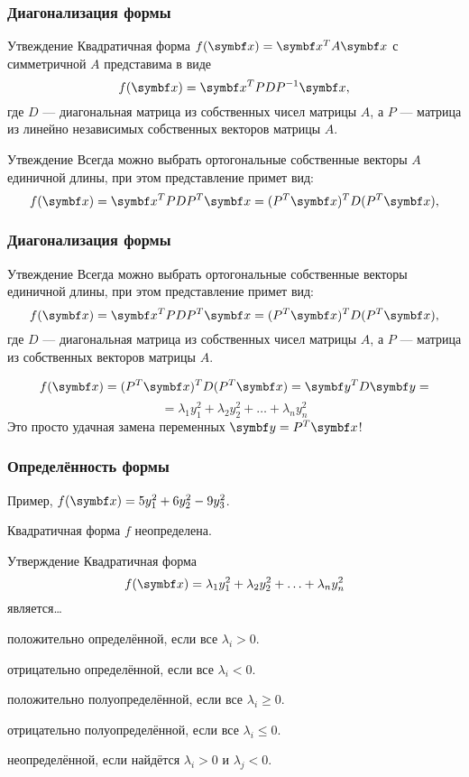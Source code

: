 \begin{frame}
    \frametitle{Диагонализация формы}

    \begin{block}{Утвеждение}
        Квадратичная форма $f(\bx) = \bx^T A \bx$ с симметричной $A$ представима в виде
        \[
        f(\bx) = \bx^T PDP^{-1} \bx,    
        \] 
        где $D$ — диагональная матрица из собственных чисел матрицы $A$, 
        а $P$ — матрица из линейно независимых собственных векторов матрицы $A$.
    \end{block}
    \pause
\begin{block}{Утвеждение}
    Всегда можно выбрать ортогональные собственные векторы $A$ единичной длины, 
    при этом представление примет вид:
    \[
    f(\bx) = \bx^T PDP^T \bx = (P^T \bx)^T D (P^T \bx),    
    \] 
\end{block}
    
\end{frame}


\begin{frame}
    \frametitle{Диагонализация формы}
\begin{block}{Утвеждение}
    Всегда можно выбрать ортогональные собственные векторы единичной длины, 
    при этом представление примет вид:
    \[
    f(\bx) = \bx^T PDP^T \bx = (P^T \bx)^T D (P^T \bx),    
    \] 
    где $D$ — диагональная матрица из собственных чисел матрицы $A$, 
    а $P$ — матрица из собственных векторов матрицы $A$.
\end{block}
    \pause
    \[
    f(\bx) =  (P^T \bx)^T D (P^T \bx) = \by^T D \by = 
    \]
    \[
    = \lambda_1 y_1^2 + \lambda_2 y_2^2 + \ldots + \lambda_n y_n^2
    \]
    \pause
    Это просто удачная замена переменных $\by=P^T \bx$!
\end{frame}

\begin{frame}
    \frametitle{Определённость формы}
    Пример, $f(\bx) = 5 y_1^2 + 6y_2^2 - 9y_3^2$. \pause

    Квадратичная форма $f$ неопределена. 
    \pause
\begin{block}{Утверждение}
    Квадратичная форма 
    \[
      f(\bx) = \lambda_1 y_1^2 + \lambda_2 y_2^2 + \ldots + \lambda_n y_n^2  
    \]
    является\ldots\pause 

    положительно определённой, если все $\lambda_i >0$.\pause

    отрицательно определённой, если все $\lambda_i <0$.\pause

    положительно полуопределённой, если все $\lambda_i \geq 0$.\pause

    отрицательно полуопределённой, если все $\lambda_i \leq 0$.\pause

    неопределённой, если найдётся $\lambda_i >0$ и $\lambda_j < 0$.
\end{block}

\end{frame}

